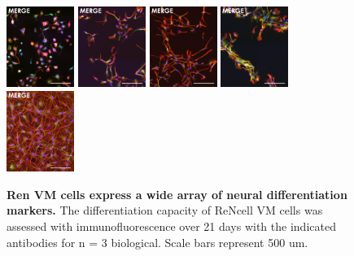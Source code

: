 \documentclass[onecolumn,10pt]{asme2ej}
\begin{document}
\begin{figure}[h]
	\includegraphics[width=0.196\textwidth]{figures/IF/charac(light)/d0-m}
	\includegraphics[width=0.196\textwidth]{figures/IF/charac(light)/d3-m}	\includegraphics[width=0.196\textwidth]{figures/IF/charac(light)/d7-m}	\includegraphics[width=0.196\textwidth]{figures/IF/charac(light)/d14-m}	\includegraphics[width=0.196\textwidth]{figures/IF/charac(light)/d21-m}
	
	\caption{\textbf{Ren VM cells express a wide array of neural differentiation markers.} The differentiation capacity of ReNcell VM cells was assessed with immunofluorescence over 21 days with the indicated antibodies for n = 3 biological. Scale bars represent 500 um.}
	\label{diff-vm}
\end{figure}
\newpage
\end{document}
